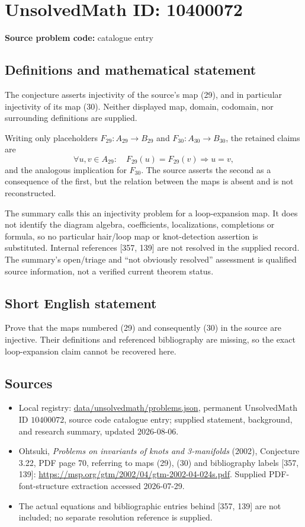 \documentclass[11pt]{article}
\begin{document}
\section*{UnsolvedMath ID: 10400072}
\textbf{Source problem code:} catalogue entry
\subsection{Definitions and mathematical statement}
The conjecture asserts injectivity of the source's map (29), and in particular injectivity of its map (30). Neither displayed map, domain, codomain, nor surrounding definitions are supplied.

Writing only placeholders \(F_{29}:A_{29}\to B_{29}\) and \(F_{30}:A_{30}\to B_{30}\), the retained claims are
\[
 \forall u,v\in A_{29}:\quad F_{29}(u)=F_{29}(v)\Longrightarrow u=v,
\]
and the analogous implication for \(F_{30}\). The source asserts the second as a consequence of the first, but the relation between the maps is absent and is not reconstructed.

The summary calls this an injectivity problem for a loop-expansion map. It does not identify the diagram algebra, coefficients, localizations, completions or formula, so no particular hair/loop map or knot-detection assertion is substituted. Internal references [357, 139] are not resolved in the supplied record. The summary's open/triage and ``not obviously resolved'' assessment is qualified source information, not a verified current theorem status.
\subsection{Short English statement}
Prove that the maps numbered (29) and consequently (30) in the source are injective. Their definitions and referenced bibliography are missing, so the exact loop-expansion claim cannot be recovered here.
\subsection{Sources}
\begin{itemize}
\item Local registry: \url{data/unsolvedmath/problems.json}, permanent UnsolvedMath ID \(10400072\), source code catalogue entry; supplied statement, background, and research summary, updated 2026-08-06.
\item Ohtsuki, \emph{Problems on invariants of knots and 3-manifolds} (2002), Conjecture 3.22, PDF page 70, referring to maps (29), (30) and bibliography labels [357, 139]: \url{https://msp.org/gtm/2002/04/gtm-2002-04-024s.pdf}. Supplied PDF-font-structure extraction accessed 2026-07-29.
\item The actual equations and bibliographic entries behind [357, 139] are not included; no separate resolution reference is supplied.
\end{itemize}
\end{document}
